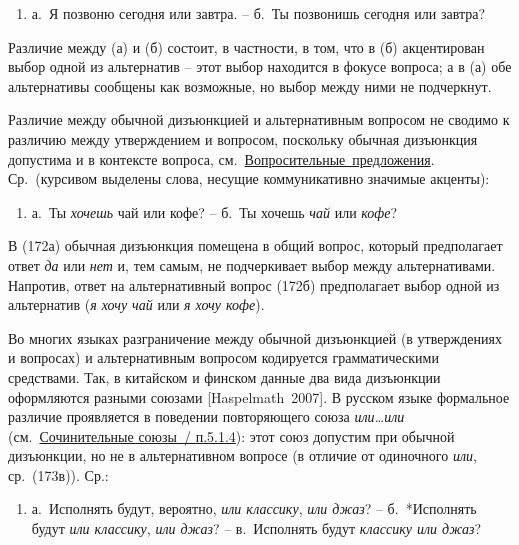 \begin{enumerate}
\def\labelenumi{(\arabic{enumi})}
\setcounter{enumi}{170}
\item
  а.~Я позвоню сегодня или завтра. -- б.~Ты позвонишь сегодня или
  завтра?
\end{enumerate}

Различие между (а) и (б) состоит, в частности, в том, что в (б)
акцентирован выбор одной из альтернатив -- этот выбор находится в фокусе
вопроса; а в (а) обе альтернативы сообщены как возможные, но выбор между
ними не подчеркнут.

Различие между обычной дизъюнкцией и альтернативным вопросом не сводимо
к различию между утверждением и вопросом, поскольку обычная дизъюнкция
допустима и в контексте вопроса,
см.~\underline{Вопросительные~предложения}. Ср.~(курсивом выделены
слова, несущие коммуникативно значимые акценты):

\begin{enumerate}
\def\labelenumi{(\arabic{enumi})}
\setcounter{enumi}{171}
\item
  а.~Ты \emph{хочешь} чай или кофе? -- б.~Ты хочешь \emph{чай} или
  \emph{кофе}?
\end{enumerate}

В (172а) обычная дизъюнкция помещена в общий вопрос, который
предполагает ответ \emph{да} или \emph{нет} и, тем самым, не
подчеркивает выбор между альтернативами. Напротив, ответ на
альтернативный вопрос (172б) предполагает выбор одной из альтернатив
(\emph{я хочу чай} или \emph{я хочу кофе}).

Во многих языках разграничение между обычной дизъюнкцией (в утверждениях
и вопросах) и альтернативным вопросом кодируется грамматическими
средствами. Так, в китайском и финском данные два вида дизъюнкции
оформляются разными союзами {[}Haspelmath~2007{]}. В русском языке
формальное различие проявляется в поведении повторяющего союза
\emph{или\ldots или} (см.~\underline{Сочинительные союзы~/ п.5.1.4}):
этот союз допустим при обычной дизъюнкции, но не в альтернативном
вопросе (в отличие от одиночного \emph{или}, ср.~(173в)). Ср.:

\begin{enumerate}
\def\labelenumi{(\arabic{enumi})}
\setcounter{enumi}{172}
\item
  а.~Исполнять будут, вероятно, \emph{или классику}, \emph{или джаз}? --
  б.~*Исполнять будут \emph{или классику}, \emph{или джаз}? --
  в.~Исполнять будут \emph{классику или джаз}?
\end{enumerate}

